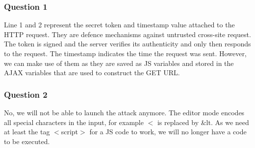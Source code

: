 \documentclass[a4paper]{article}
\begin{document}
\subsubsection{Question 1}
Line 1 and 2 represent the secret token and timestamp value attached to the HTTP request. They are defence mechanisms against untrusted cross-site request. The token is signed and the server verifies its authenticity and only then responds to the request. The timestamp indicates the time the request was sent. However, we can make use of them as they are saved as JS variables and stored in the AJAX variables that are used to construct the GET URL.
\subsubsection{Question 2}
No, we will not be able to launch the attack anymore. The editor mode encodes all special characters in the input, for example $<$ is replaced by \&lt. As we need at least the tag $<$script$>$ for a JS code to work, we will no longer have a code to be executed.
\end{document}
